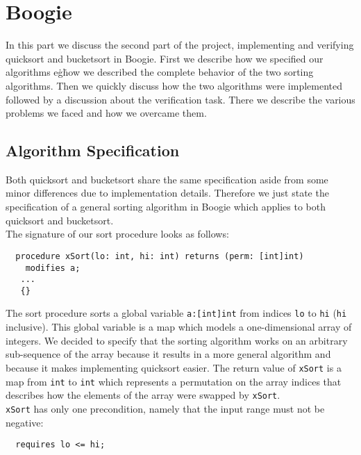 \section{Boogie}\label{boogie_discussion}

In this part we discuss the second part of the project, implementing and verifying quicksort and bucketsort 
in Boogie. First we describe how we specified our algorithms e\.g\. how we described the complete behavior
of the two sorting algorithms. Then we quickly discuss how the two algorithms were implemented followed by a 
discussion about the verification task. There we describe the various problems we faced and how we overcame them.

\subsection{Algorithm Specification}

Both quicksort and bucketsort share the same specification aside from some minor differences due to 
implementation details. Therefore we just state the specification of a general sorting algorithm in Boogie which 
applies to both quicksort and bucketsort.\\

The signature of our sort procedure looks as follows:

\begin{verbatim}
  procedure xSort(lo: int, hi: int) returns (perm: [int]int)  
    modifies a;
   ...
   {}
 \end{verbatim}

The sort procedure sorts a global variable \texttt{a:[int]int} from indices \texttt{lo} to \texttt{hi} (\texttt{hi} inclusive).
This global variable is a map which models a one-dimensional array of integers. 
We decided to specify that the sorting algorithm works on an arbitrary sub-sequence of the array 
because it results in a more general algorithm and because it makes implementing quicksort easier.
The return value of \texttt{xSort} is a map from \texttt{int} to \texttt{int} which represents a permutation on the
array indices that describes how the elements of the array were swapped by \texttt{xSort}.
\\

\texttt{xSort} has only one precondition, namely that the input range must not be negative:
\begin{verbatim}
  requires lo <= hi;
\end{verbatim}

